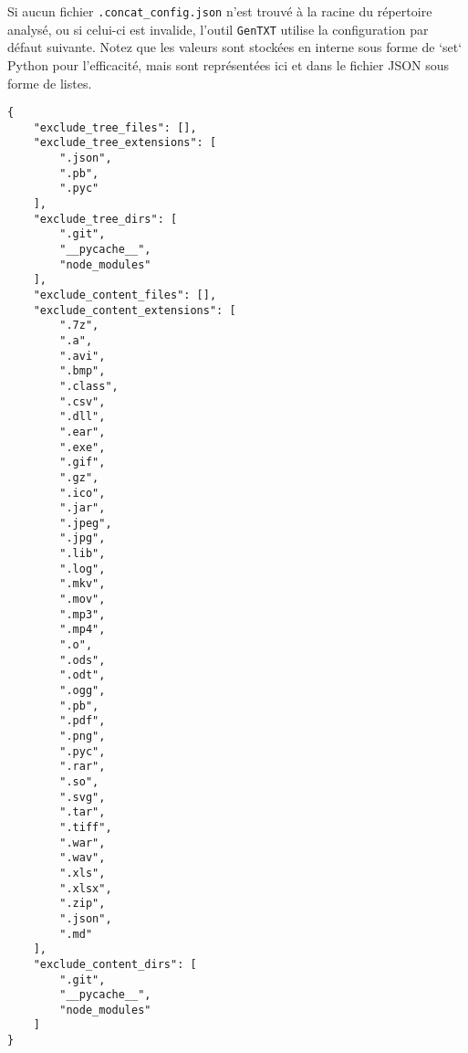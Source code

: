 \documentclass[11pt, a4paper]{article}
\begin{document}
Si aucun fichier \texttt{.concat\_config.json} n'est trouvé à la racine du répertoire analysé, ou si celui-ci est invalide, l'outil \texttt{GenTXT} utilise la configuration par défaut suivante. Notez que les valeurs sont stockées en interne sous forme de `set` Python pour l'efficacité, mais sont représentées ici et dans le fichier JSON sous forme de listes.

\begin{lstlisting}[style=jsonstyle, % REMOVED language=json
	caption={Structure et valeurs par défaut de .concat\_config.json},
	label={lst:default_config}]
{
    "exclude_tree_files": [],
    "exclude_tree_extensions": [
        ".json",
        ".pb",
        ".pyc"
    ],
    "exclude_tree_dirs": [
        ".git",
        "__pycache__",
        "node_modules"
    ],
    "exclude_content_files": [],
    "exclude_content_extensions": [
        ".7z",
        ".a",
        ".avi",
        ".bmp",
        ".class",
        ".csv",
        ".dll",
        ".ear",
        ".exe",
        ".gif",
        ".gz",
        ".ico",
        ".jar",
        ".jpeg",
        ".jpg",
        ".lib",
        ".log",
        ".mkv",
        ".mov",
        ".mp3",
        ".mp4",
        ".o",
        ".ods",
        ".odt",
        ".ogg",
        ".pb",
        ".pdf",
        ".png",
        ".pyc",
        ".rar",
        ".so",
        ".svg",
        ".tar",
        ".tiff",
        ".war",
        ".wav",
        ".xls",
        ".xlsx",
        ".zip",
        ".json",
        ".md"
    ],
    "exclude_content_dirs": [
        ".git",
        "__pycache__",
        "node_modules"
    ]
}
\end{lstlisting}


\end{document}
